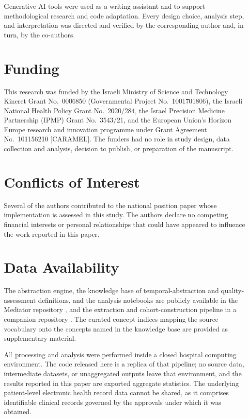 Generative AI tools were used as a writing assistant and to support
methodological research and code adaptation. Every design choice, analysis
step, and interpretation was directed and verified by the corresponding
author and, in turn, by the co-authors.

\section*{Funding}
This research was funded by the Israeli Ministry of Science and Technology
Kineret Grant No.~0006850 (Governmental Project No.~1001701806), the Israeli
National Health Policy Grant No.~2020/284, the Israel Precision Medicine
Partnership (IPMP) Grant No.~3543/21, and the European Union's Horizon Europe
research and innovation programme under Grant Agreement No.~101156210
[CARAMEL]. The funders had no role in study design, data collection and
analysis, decision to publish, or preparation of the manuscript.

\section*{Conflicts of Interest}
Several of the authors contributed to the national position paper whose
implementation is assessed in this study. The authors declare no competing
financial interests or personal relationships that could have appeared to
influence the work reported in this paper.

\section*{Data Availability}
The abstraction engine, the knowledge base of temporal-abstraction and
quality-assessment definitions, and the analysis notebooks are publicly
available in the Mediator repository \citep{mediator-github}, and the
extraction and cohort-construction pipeline in a companion repository
\citep{kineret-etl-github}. The curated concept indices mapping the source
vocabulary onto the concepts named in the knowledge base are provided as
supplementary material.

All processing and analysis were performed inside a closed hospital computing
environment. The code released here is a replica of that pipeline; no source
data, intermediate datasets, or unaggregated outputs leave that environment,
and the results reported in this paper are exported aggregate statistics. The
underlying patient-level electronic health record data cannot be shared, as
it comprises identifiable clinical records governed by the approvals under
which it was obtained.

